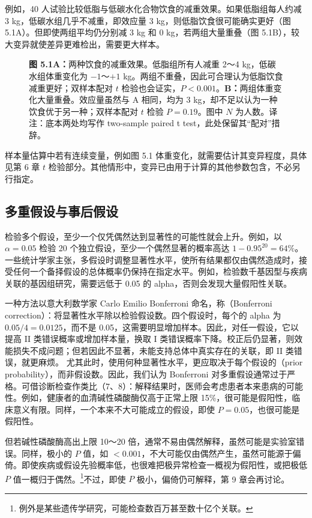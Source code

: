 例如，40 人试验比较低脂与低碳水化合物饮食的减重效果。如果低脂组每人约减 3 kg，低碳水组几乎不减重，即效应量 3 kg，则低脂饮食很可能确实更好（图 5.1A）。但即使两组平均仍分别减 3 kg 和 0 kg，若两组大量重叠（图 5.1B），较大变异就使差异更难检出，需要更大样本。
\par
\begin{figure}[htbp]\centering\chfivediets
\caption*{\textbf{图 5.1}\quad \textbf{A：}两种饮食的减重效果。低脂组所有人减重 2～4 kg，低碳水组体重变化为 $-1$～$+1$ kg。两组不重叠，因此可合理认为低脂饮食减重更好；双样本配对 $t$ 检验也会证实，$P<0.001$。\textbf{B：}两组体重变化大量重叠。效应量虽然与 A 相同，均为 3 kg，却不足以认为一种饮食优于另一种；双样本配对 $t$ 检验 $P=0.19$。图中 $N$ 为人数。译注：底本两处均写作 two-sample paired t test，此处保留其“配对”措辞。}
\end{figure}\par
{}
样本量估算中若有连续变量，例如图 5.1 体重变化，就需要估计其变异程度，具体见第 6 章 $t$ 检验部分。其他情形中，变异已由用于计算的其他参数包含，不必另行指定。

\subsection{多重假设与事后假设}
检验多个假设，至少一个仅凭偶然达到显著性的可能性就会上升。例如，以 $\alpha=0.05$ 检验 20 个独立假设，至少一个偶然显著的概率高达 $1-0.95^{20}=64\%$。一些统计学家主张，多假设时调整显著性水平，使所有结果都仅由偶然造成时，接受任何一个备择假设的总体概率仍保持在指定水平。例如，检验数千基因型与疾病关联的基因组研究，需要远低于 0.05 的 alpha，否则会发现大量假阳性关联。

一种方法以意大利数学家 Carlo Emilio Bonferroni 命名，称（Bonferroni correction）：将显著性水平除以检验假设数。四个假设时，每个的 alpha 为 $0.05/4=0.0125$，而不是 0.05，这需要明显增加样本。因此，对任一假设，它以提高 II 类错误概率或增加样本量，换取 I 类错误概率下降。校正后仍显著，则效能损失不成问题；但若因此不显著，未能支持总体中真实存在的关联，即 II 类错误，就更麻烦。
尤其此时，使用何种显著性水平，更应取决于每个假设的（prior probability），而非假设数。因此，我们认为 Bonferroni 对多重假设通常过于严格。可借诊断检查作类比（7、8）：解释结果时，医师会考虑患者本来患病的可能性。例如，健康者的血清碱性磷酸酶仅高于正常上限 15\%，很可能是假阳性，临床意义有限。同样，一个本来不大可能成立的假设，即使 $P=0.05$，也很可能是假阳性。

但若碱性磷酸酶高出上限 10～20 倍，通常不易由偶然解释，虽然可能是实验室错误。同样，极小的 $P$ 值，如 $<0.001$，不大可能仅由偶然产生，虽然可能源于偏倚。即使疾病或假设先验概率低，也很难把极异常检查一概视为假阳性，或把极低 $P$ 值一概归于偶然。\footnote{例外是某些遗传学研究，可能检查数百万甚至数十亿个关联。}不过，即使 $P$ 极小，偏倚仍可解释，第 9 章会再讨论。

